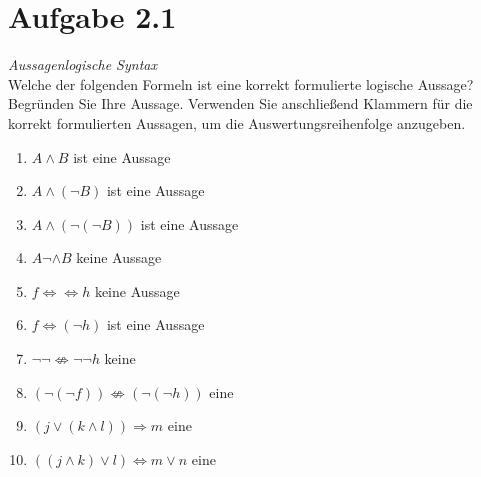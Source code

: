 \documentclass[12pt]{article}
\begin{document}
  
  \section*{Aufgabe 2.1}
  \textit{{Aussagenlogische Syntax}}
 \\
 Welche der folgenden Formeln ist eine korrekt formulierte logische Aussage? Begründen Sie Ihre Aussage. Verwenden Sie anschließend Klammern für die korrekt formulierten Aussagen, um die Auswertungsreihenfolge anzugeben.  
  
 \begin{enumerate} 
 \item $A \wedge B$ ist eine Aussage
 \item $A \wedge (\neg B)$ ist eine Aussage
 \item $A \wedge (\neg (\neg B))$ ist eine Aussage 
 \item $A \neg \wedge B$ keine Aussage 
 \item $f \Leftrightarrow \Leftrightarrow h$ keine Aussage 
 \item $f \Leftrightarrow (\neg h)$ ist eine Aussage
 \item $\neg \neg \not \Leftrightarrow \neg \neg h$ keine
 \item $(\neg (\neg f)) \not \Leftrightarrow (\neg (\neg h))$ eine 
 \item $(j \vee (k \wedge l)) \Rightarrow m$ eine 
 \item $((j \wedge k) \vee l) \Leftrightarrow m \vee n$ eine  
 \end{enumerate} 
  
  
  
  
  
\end{document}
